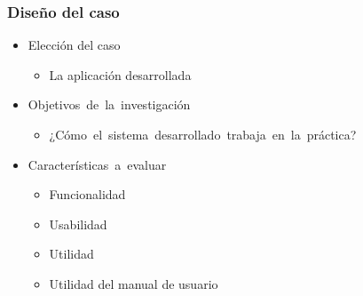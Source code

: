 \documentclass[9pt]{beamer}
\begin{document}
    \begin{frame}
        \frametitle{Diseño del caso}                       
        
        \begin{itemize}
            \item Elección del caso
            \begin{itemize}
                \item La aplicación desarrollada
            \end{itemize}

            \item Objetivos de la investigación
            \begin{itemize}
                \item ¿Cómo el sistema desarrollado trabaja en la práctica?
            \end{itemize}

            \item Características a evaluar
            \begin{itemize}
                \item Funcionalidad
                \item Usabilidad
                \item Utilidad
                \item Utilidad del manual de usuario
            \end{itemize}
        \end{itemize}

    \end{frame}
\end{document}

